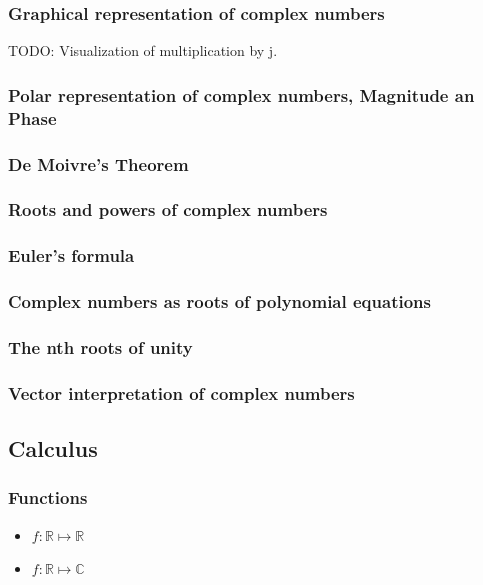 \subsubsection*{Graphical representation of complex numbers}

TODO: Visualization of multiplication by j.

\subsubsection*{Polar representation of complex numbers, Magnitude an Phase}

\subsubsection*{De Moivre's Theorem}

\subsubsection*{Roots and powers of complex numbers}

\subsubsection*{Euler's formula}

\subsubsection*{Complex numbers as roots of polynomial equations}

\subsubsection*{The nth roots of unity}

\subsubsection*{Vector interpretation of complex numbers}

\subsection*{Calculus}

\subsubsection*{Functions}

\begin{itemize}
\item $f:\mathbb{R}\mapsto\mathbb{R}$
\item $f:\mathbb{R}\mapsto\mathbb{C}$
\end{itemize}

